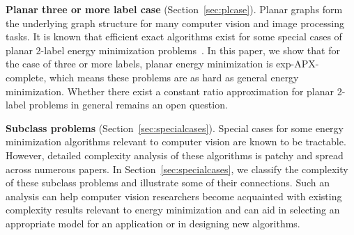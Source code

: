 \textbf{Planar three or more label case}  (Section~\ref{sec:plcase}). Planar graphs form the underlying graph structure for many computer vision and image processing tasks. It is known that efficient exact algorithms exist for some special cases of planar 2-label energy minimization problems~\cite{Schraudolph-10}.  In this paper, we show that for the case of three or more labels, planar energy minimization is exp-APX-complete, which means these problems are as hard as general energy minimization. Whether there exist a constant ratio approximation for planar 2-label problems in general remains an open question.

\textbf{Subclass problems}  (Section~\ref{sec:specialcases}). Special cases for some energy minimization algorithms relevant to computer vision are known to be tractable. However, detailed complexity analysis of these algorithms is patchy and spread across numerous papers.  In Section~\ref{sec:specialcases}, we classify the complexity of these subclass problems and illustrate some of their connections.  Such an analysis can help computer vision researchers become acquainted with existing complexity results relevant to energy minimization and can aid in selecting an appropriate model for an application or in designing new algorithms.






